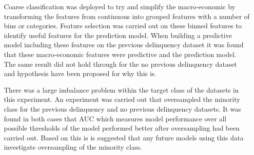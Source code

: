 Coarse classification was deployed to try and simplify the macro-economic by transforming the features from continuous into grouped features with a number of bins or categories. Feature selection was carried out on these binned features to identify useful features for the prediction model. When building a predictive model including these features on the previous delinquency dataset it was found that these macro-economic features were predictive and the prediction model. The same result did not hold through for the no previous delinquency dataset and hypothesis have been proposed for why this is.


There was a large imbalance problem within the target class of the datasets in this experiment. An experiment was carried out that oversampled the minority class for the previous delinquency and no previous delinquency datasets. It was found in both cases that AUC which measures model performance over all possible thresholds of the model performed better after oversampling had been carried out. Based on this is is suggested that any future models using this data investigate oversampling of the minority class.




  